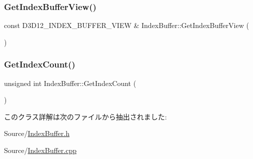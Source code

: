 \subsubsection{\texorpdfstring{Get\+Index\+Buffer\+View()}{GetIndexBufferView()}}
{\footnotesize\ttfamily const D3\+D12\+\_\+\+I\+N\+D\+E\+X\+\_\+\+B\+U\+F\+F\+E\+R\+\_\+\+V\+I\+EW \& Index\+Buffer\+::\+Get\+Index\+Buffer\+View (\begin{DoxyParamCaption}{ }\end{DoxyParamCaption})}

\mbox{\label{class_index_buffer_a56fc4351097f2c2afcdf64b25a86673c}} 
\subsubsection{\texorpdfstring{Get\+Index\+Count()}{GetIndexCount()}}
{\footnotesize\ttfamily unsigned int Index\+Buffer\+::\+Get\+Index\+Count (\begin{DoxyParamCaption}{ }\end{DoxyParamCaption})}



このクラス詳解は次のファイルから抽出されました\+:\begin{DoxyCompactItemize}
\item 
Source/\mbox{\hyperlink{_index_buffer_8h}{Index\+Buffer.\+h}}\item 
Source/\mbox{\hyperlink{_index_buffer_8cpp}{Index\+Buffer.\+cpp}}\end{DoxyCompactItemize}

